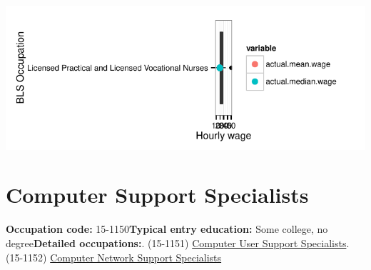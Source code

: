 \documentclass[a4paper,10pt]{article}\usepackage[]{graphicx}\usepackage[]{color}
\makeatletter
\def\maxwidth{ %
  \ifdim\Gin@nat@width>\linewidth
    \linewidth
  \else
    \Gin@nat@width
  \fi
}
\makeatother
\begin{document}
{\centering \includegraphics[width=\maxwidth]{figure/unnamed-chunk-239} 

}


\newpage\section{Computer Support Specialists}\textbf{Occupation code:} 15-1150\newline\textbf{Typical entry education:} Some college, no degree\newline\textbf{Detailed occupations:}. (15-1151)  \href{http://www.bls.gov/oes/current/oes151151.htm}{Computer User Support Specialists}. (15-1152)  \href{http://www.bls.gov/oes/current/oes151152.htm}{Computer Network Support Specialists}\newline%
\end{document}
